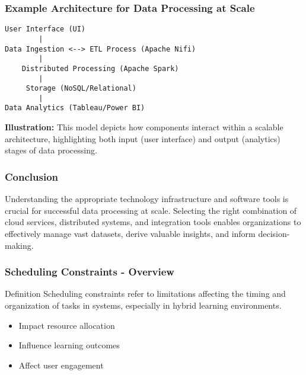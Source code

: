 \documentclass[aspectratio=169]{beamer}
\begin{document}
\begin{frame}[fragile]
    \frametitle{Example Architecture for Data Processing at Scale}
    \begin{center}
    \begin{verbatim}
User Interface (UI) 
        |
Data Ingestion <--> ETL Process (Apache Nifi)
        |
    Distributed Processing (Apache Spark)
        |
     Storage (NoSQL/Relational)
        |
Data Analytics (Tableau/Power BI)
    \end{verbatim}
    \end{center}
    \textbf{Illustration:} This model depicts how components interact within a scalable architecture, highlighting both input (user interface) and output (analytics) stages of data processing.
\end{frame}

\begin{frame}[fragile]
    \frametitle{Conclusion}
    Understanding the appropriate technology infrastructure and software tools is crucial for successful data processing at scale. Selecting the right combination of cloud services, distributed systems, and integration tools enables organizations to effectively manage vast datasets, derive valuable insights, and inform decision-making.
\end{frame}

\begin{frame}[fragile]
    \frametitle{Scheduling Constraints - Overview}
    \begin{block}{Definition}
        Scheduling constraints refer to limitations affecting the timing and organization of tasks in systems, especially in hybrid learning environments.
    \end{block}
    \begin{itemize}
        \item Impact resource allocation
        \item Influence learning outcomes
        \item Affect user engagement
    \end{itemize}
\end{frame}
\end{document}
